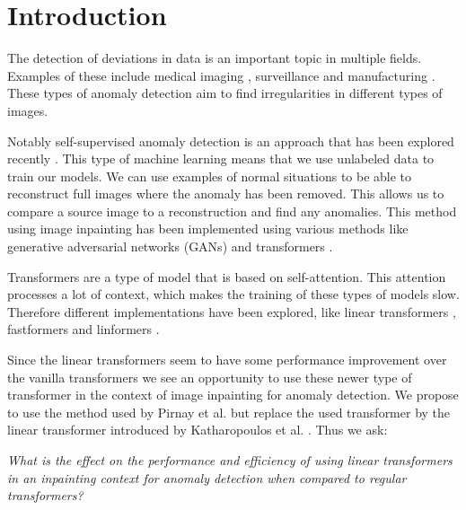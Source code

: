 \chapter{Introduction}\label{ch:introduction}

The detection of deviations in data is an important topic in multiple fields. Examples of these include medical imaging \cite{han_madgan_2021}, surveillance \cite{shashikar_traffic_2017} and manufacturing \cite{susto_anomaly_2017}. These types of anomaly detection aim to find irregularities in different types of images.


Notably self-supervised anomaly detection is an approach that has been explored recently \cite{li_cutpaste_2021, ali_self-supervised_2020}. This type of machine learning means that we use unlabeled data to train our models. We can use examples of normal situations to be able to reconstruct full images where the anomaly has been removed. This allows us to compare a source image to a reconstruction and find any anomalies. This method using image inpainting has been implemented using various methods like generative adversarial networks (GANs) \cite{yeh_semantic_2017} and transformers \cite{pirnay_inpainting_2021}.


Transformers \cite{vaswani_attention_2017} are a type of model that is based on self-attention. This attention processes a lot of context, which makes the training of these types of models slow. Therefore different implementations have been explored, like linear transformers \cite{katharopoulos_transformers_2020}, fastformers \cite{wu_fastformer_2021} and linformers \cite{wang_linformer_2020}.

Since the linear transformers seem to have some performance improvement over the vanilla transformers we see an opportunity to use these newer type of transformer in the context of image inpainting for anomaly detection. We propose to use the method used by Pirnay et al. \cite{pirnay_inpainting_2021} but replace the used transformer by the linear transformer introduced by Katharopoulos et al. \cite{katharopoulos_transformers_2020}. Thus we ask:

\textit{What is the effect on the performance and efficiency of using linear transformers in an inpainting context for anomaly detection when compared to regular transformers?}

